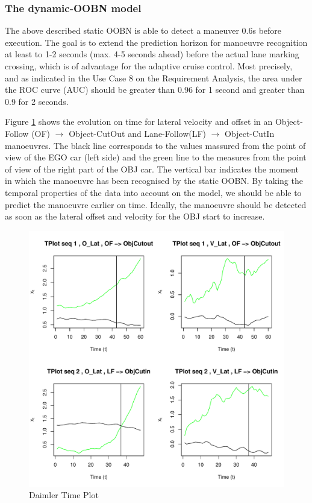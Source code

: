 \subsubsection*{The dynamic-OOBN model}

The above described static OOBN is able to detect a maneuver 0.6s before execution. The goal is to extend the prediction horizon for manoeuvre recognition at least to 1-2 seconds (max. 4-5 seconds ahead) before the actual lane marking crossing, which is of advantage for the adaptive cruise control. Most precisely, and as indicated in the Use Case 8 on the Requirement Analysis,  the area under the ROC curve (AUC) should be greater than 0.96 for 1 second and greater than 0.9 for 2 seconds.

Figure \ref{Figure:daimlerTPlot} shows the evolution on time for lateral velocity and offset in an Object-Follow (OF) $\rightarrow$ Object-CutOut and Lane-Follow(LF) $\rightarrow$ Object-CutIn manoeuvres. The black line corresponds to the values massured from the point of view of the EGO car (left side) and the green line to the measures from the point of view of the right part of the OBJ car. The vertical bar indicates the moment in which the manoeuvre has been recognised by the static OOBN. By taking the temporal properties of the data into account on the model, we should be able to predict the manoeuvre earlier on time. Ideally, the manoeuvre should be detected as soon as the lateral offset and velocity for the OBJ start to increase. 

\begin{figure}[tb]
\begin{center}
\includegraphics[scale=0.65]{./figures/DaimlerLE_EGO_L_LE_OBJ_L_OBJCut.pdf}
\caption{\label{Figure:daimlerTPlot}Daimler Time Plot}
\end{center}
\end{figure}

